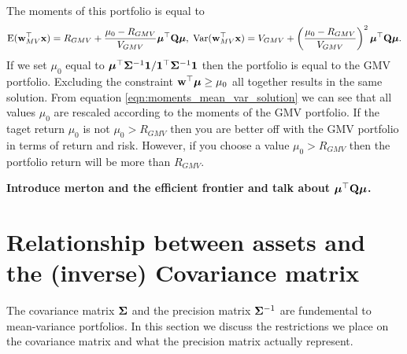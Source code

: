 \documentclass[]{book}
\begin{document}
The moments of this portfolio is equal to
\begin{equation}\label{eqn:moments_mean_var_solution}
\operatorname{E}(\mathbf{w}_{MV}^\top\mathbf{x}) = R_{GMV} + \frac{\mu_0 - R_{GMV}}{V_{GMV}} \mbox{\boldmath$\mu$}^\top \mathbf{Q} \mbox{\boldmath$\mu$}, \;
\operatorname{Var}(\mathbf{w}_{MV}^\top\mathbf{x}) =V_{GMV} + \left(\frac{\mu_0 - R_{GMV}}{V_{GMV}}\right)^2 \mbox{\boldmath$\mu$}^\top \mathbf{Q} \mbox{\boldmath$\mu$}.
\end{equation}
If we set $\mu_0$ equal to $\mbox{\boldmath$\mu$}^\top \mathbf{\Sigma}^{-1} \mathbf{1} / \mathbf{1}^\top \mathbf{\Sigma}^{-1} \mathbf{1}$ then the portfolio is equal to the GMV portfolio. 
Excluding the constraint $\mathbf{w}^\top \mbox{\boldmath$\mu$} \geq \mu_0$ all together results in the same solution.
From equation \eqref{eqn:moments_mean_var_solution} we can see that all values $\mu_0$ are rescaled according to the moments of the GMV portfolio. 
If the taget return $\mu_0$ is not $\mu_0>R_{GMV}$ then you are better off with the GMV portfolio in terms of return and risk.
However, if you choose a value $\mu_0>R_{GMV}$ then the portfolio return will be more than $R_{GMV}$.


\textbf{Introduce merton and the efficient frontier and talk about $\mbox{\boldmath$\mu$}^\top \mathbf{Q} \mbox{\boldmath$\mu$}$.}

\section{Relationship between assets and the (inverse) Covariance matrix}\label{subsec:cov_prec_matrix}
The covariance matrix $\mathbf{\Sigma}$ and the precision matrix $\mathbf{\Sigma}^{-1}$ are fundemental to mean-variance portfolios. In this section we discuss the restrictions we place on the covariance matrix and what the precision matrix actually represent. 
\end{document}
